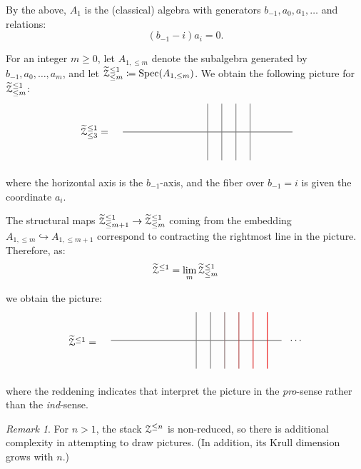 \documentclass[reqno,11pt]{amsart}
\numberwithin{equation}{subsection}
\theoremstyle{remark}
\newtheorem{rem}[thm]{Remark}
\newcommand{\into}{\hookrightarrow}
\newcommand{\sZ}{{\EuScript Z}}
\newcommand{\on}{\operatorname}
\newcommand{\Spec}{\on{Spec}}
\renewcommand{\lim}{\on{lim}}
\begin{document}
By the above, $A_1$ is the (classical) algebra with generators
$b_{-1},a_0,a_1,\ldots$ and relations:
%
\[
(b_{-1}-i)a_i = 0.
\] 

\noindent For an integer $m \geq 0$, let $A_{1,\leq m}$ denote the
subalgebra generated by $b_{-1},a_0,\ldots,a_m$, and let
$\widetilde{\sZ}_{\leq m}^{\leq 1} \coloneqq \Spec(A_{1,\leq m})$.
We obtain the following picture for $\widetilde{\sZ}_{\leq m}^{\leq 1}$:
%
\[
\begin{tikzpicture}
\draw[gray, thick] (-3,0) -- (3,0);
\draw[gray, thick] (0,-1) -- (0,1);
\draw[gray, thick] (.5,-1) -- (.5,1);
\draw[gray, thick] (1,-1) -- (1,1);
\draw[gray, thick] (1.5,-1) -- (1.5,1);
\node at (-4, 0)   (a) {$\widetilde{\sZ}_{\leq 3}^{\leq 1} = $} ;
\end{tikzpicture}
\]

\noindent where the horizontal axis is the $b_{-1}$-axis, and the fiber
over $b_{-1} = i$ is given the coordinate $a_i$.

The structural maps $\widetilde{\sZ}_{\leq m+1}^{\leq 1} \to 
\widetilde{\sZ}_{\leq m}^{\leq 1}$ coming from the 
embedding $A_{1,\leq m} \into A_{1,\leq m+1}$ correspond to contracting 
the rightmost line in the picture. Therefore, as:
%
\[
\widetilde{\sZ}^{\leq 1} = \underset{m}{\lim} \, \widetilde{\sZ}_{\leq m}^{\leq 1}
\]

\noindent we obtain the picture:
%
\[
\begin{tikzpicture}
\draw[gray, thick] (-3,0) -- (3,0);
\draw[gray, thick] (0,-1) -- (0,1);
\draw[gray, thick] (.5,-1) -- (.5,1);
\draw[gray!90!red, thick] (1,-1) -- (1,1);
\draw[gray!60!red, thick] (1.5,-1) -- (1.5,1);
\draw[gray!30!red, thick] (2,-1) -- (2,1);
\draw[gray!15!red, thick] (2.5,-1) -- (2.5,1);
\node at (-4, 0)   (a) {$\widetilde{\sZ}^{\leq 1} = $} ;
\node at (3.5, 0)   (b) {$\ldots$} ;
\end{tikzpicture}
\]

\noindent where the reddening indicates that interpret the
picture in the \emph{pro}-sense rather than the \emph{ind}-sense.

\begin{rem}

For $n > 1$, the stack $\sZ^{\leq n}$ is non-reduced, so there
is additional complexity in attempting to draw pictures.
(In addition, its Krull dimension grows with $n$.)

\end{rem}

\subsubsection{}
\end{document}

